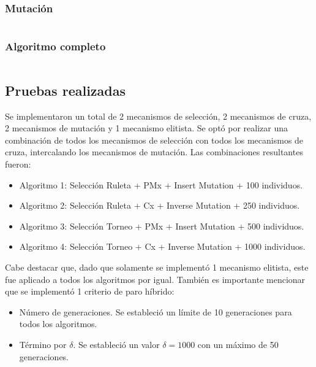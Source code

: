 \subsubsection{Mutación}
\inputminted[linenos=true, fontsize=\scriptsize]{Python}{../../utils/mutation.py}

\subsubsection{Algoritmo completo}
\inputminted[linenos=true, fontsize=\scriptsize]{Python}{../P2_EnriqueMenaCamilo.py}

\subsection{Pruebas realizadas}
Se implementaron un total de 2 mecanismos de selección, 2 mecanismos de cruza, 2 mecanismos de mutación y 1 mecanismo elitista. Se optó por realizar una combinación de todos los mecanismos de selección con todos los mecanismos de cruza, intercalando los mecanismos de mutación. Las combinaciones resultantes fueron:

\begin{itemize}
	\item Algoritmo 1: Selección Ruleta + PMx + Insert Mutation + 100 individuos.
	\item Algoritmo 2: Selección Ruleta + Cx + Inverse Mutation + 250 individuos.
	\item Algoritmo 3: Selección Torneo + PMx + Insert Mutation + 500 individuos.
	\item Algoritmo 4: Selección Torneo + Cx + Inverse Mutation + 1000 individuos.
\end{itemize}

Cabe destacar que, dado que solamente se implementó 1 mecanismo elitista, este fue aplicado a todos los algoritmos por igual. También es importante mencionar que se implementó 1 criterio de paro híbrido:

\begin{itemize}
	\item Número de generaciones. Se estableció un límite de 10 generaciones para todos los algoritmos.
	\item Término por $\delta$. Se estableció un valor $\delta=1000$ con un máximo de 50 generaciones.
\end{itemize}
